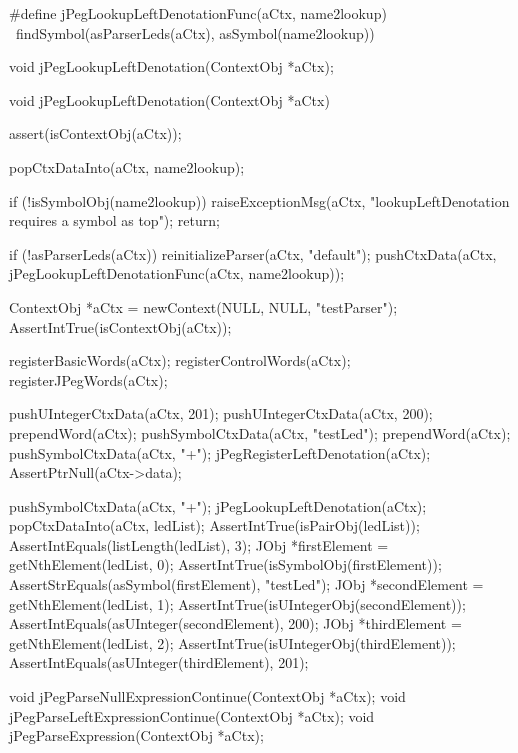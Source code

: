 \startCHeader
#define jPegLookupLeftDenotationFunc(aCtx, name2lookup)  \
  findSymbol(asParserLeds(aCtx), asSymbol(name2lookup))

void jPegLookupLeftDenotation(ContextObj *aCtx);
\stopCHeader

\startCCode
void jPegLookupLeftDenotation(ContextObj *aCtx) {
  assert(isContextObj(aCtx));

  popCtxDataInto(aCtx, name2lookup);

  if (!isSymbolObj(name2lookup)) {
    raiseExceptionMsg(aCtx,
      "lookupLeftDenotation requires a symbol as top");
    return;
  }

  if (!asParserLeds(aCtx)) reinitializeParser(aCtx, "default");
  pushCtxData(aCtx, jPegLookupLeftDenotationFunc(aCtx, name2lookup));
}
\stopCCode


\startCTest
  ContextObj *aCtx = newContext(NULL, NULL, "testParser");
  AssertIntTrue(isContextObj(aCtx));
  
  registerBasicWords(aCtx);
  registerControlWords(aCtx);
  registerJPegWords(aCtx);
  
  pushUIntegerCtxData(aCtx, 201);
  pushUIntegerCtxData(aCtx, 200);
  prependWord(aCtx);
  pushSymbolCtxData(aCtx, "testLed");
  prependWord(aCtx);
  pushSymbolCtxData(aCtx, "+");
  jPegRegisterLeftDenotation(aCtx);
  AssertPtrNull(aCtx->data);
  
  pushSymbolCtxData(aCtx, "+");
  jPegLookupLeftDenotation(aCtx);
  popCtxDataInto(aCtx, ledList);
  AssertIntTrue(isPairObj(ledList));
  AssertIntEquals(listLength(ledList), 3);
  JObj *firstElement = getNthElement(ledList, 0);
  AssertIntTrue(isSymbolObj(firstElement));
  AssertStrEquals(asSymbol(firstElement), "testLed");
  JObj *secondElement = getNthElement(ledList, 1);
  AssertIntTrue(isUIntegerObj(secondElement));
  AssertIntEquals(asUInteger(secondElement), 200);
  JObj *thirdElement = getNthElement(ledList, 2);
  AssertIntTrue(isUIntegerObj(thirdElement));
  AssertIntEquals(asUInteger(thirdElement), 201);
\stopCTest
\stopTestCase
\stopTestSuite

\startTestSuite[parseExpression]

\startCHeader
void jPegParseNullExpressionContinue(ContextObj *aCtx);
void jPegParseLeftExpressionContinue(ContextObj *aCtx);
void jPegParseExpression(ContextObj *aCtx);
\stopCHeader

